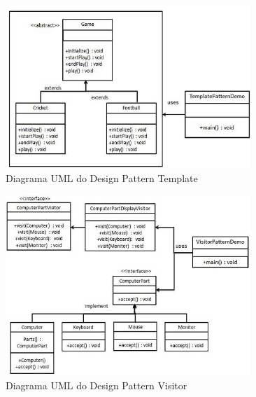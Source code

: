 \begin{figure}[H]
	\centering
	\includegraphics[width = 350px]{figuras/template_pattern_uml_diagram}
	\caption {Diagrama UML do Design Pattern Template}
	\label{fig:dp_template}
\end{figure}
\begin{figure}[H]
	\centering
	\includegraphics[width = 350px]{figuras/visitor_pattern_uml_diagram}
	\caption {Diagrama UML do Design Pattern Visitor}
	\label{fig:dp_visitor}
\end{figure}

